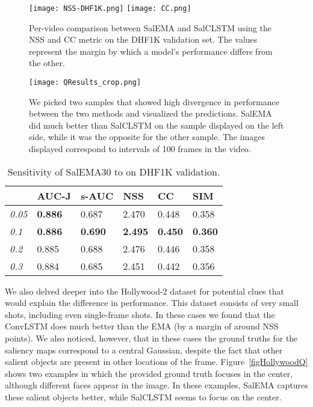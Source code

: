 \documentclass{bmvc2k}
\begin{document}
\begin{figure}[t]
\begin{center}
\texttt{[image: NSS-DHF1K.png]}
\texttt{[image: CC.png]}
\end{center}
\caption{Per-video comparison between SalEMA and SalCLSTM using the NSS and CC metric on the DHF1K validation set. The values represent the margin by which a model's performance differs from the other. } 
\label{NSS-comparison}
\end{figure}


\begin{figure}[t]
\begin{center}
\texttt{[image: QResults\_crop.png]}

\end{center}
\caption{We picked two samples that showed high divergence in performance between the two methods and visualized the predictions. SalEMA did much better than SalCLSTM on the sample displayed on the left side, while it was the opposite for the other sample. The images displayed correspond to intervals of 100 frames in the video.} 
\label{QResults}
\end{figure}

\begin{table}[t]
\begin{center}
\begin{tabularx}{\textwidth}{XXXXXl}
\toprule
\textbf{\textbf{}} & \textbf{AUC-J}  &\textbf{s-AUC} & \textbf{NSS} 	&  \textbf{CC}  & \textbf{SIM}\\
\midrule


\textit{0.05} & \textbf{0.886}	& 0.687	& 2.470	& 0.448	& 0.358\\
\textit{0.1} & \textbf{0.886}	& \textbf{0.690}	&	\textbf{2.495}	&	\textbf{0.450}	&	\textbf{0.360}\\
\textit{0.2} & 0.885	&	0.688	&	2.476	&	0.446	&	0.358\\
\textit{0.3} & 0.884	&	0.685	&	2.451	&	0.442	&	0.356\\


\bottomrule
\end{tabularx}
\end{center}
\caption{Sensitivity of SalEMA30 to  on DHF1K validation.} \label{tabAlpha}
\end{table}


We also delved deeper into the Hollywood-2 dataset for potential clues that would explain the difference in performance. This dataset consists of very small shots, including even single-frame shots. In these cases we found that the ConvLSTM does much better than the EMA (by a margin of around  NSS points). We also noticed, however, that in these cases the ground truths for the saliency maps correspond to a central Gaussian, despite the fact that other salient objects are present in other locations of the frame.
Figure~\ref{figHollywoodQ} shows two examples in which the provided ground truth focuses in the center, although different faces appear in the image. In these examples, SalEMA captures these salient objects better, while SalCLSTM seems to focus on the center.
\end{document}
